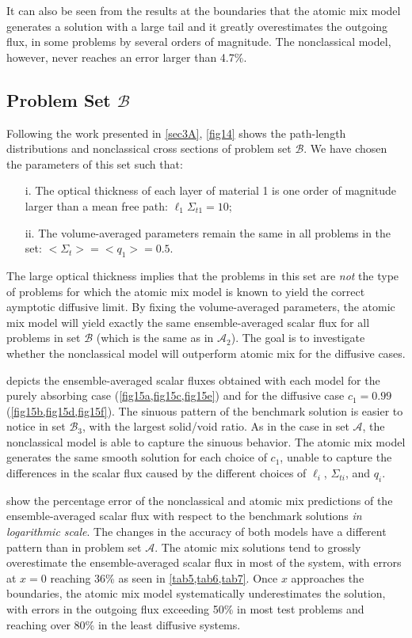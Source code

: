 \documentclass[12pt]{article}
\newcommand{\bl}{\big<}
\newcommand{\bg}{\big>}
\newcommand{\seta}{\mathcal{A}}
\newcommand{\setb}{\mathcal{B}}
\begin{document}
{It can also be seen from the results at the boundaries that the atomic mix model generates a solution with a large tail and it greatly overestimates the outgoing flux, in some problems by several orders of magnitude.
The nonclassical model, however, never reaches an error larger than 4.7\%.

\subsection{Problem Set $\setb$}

Following the work presented in \cref{sec3A}, \cref{fig14} shows the path-length distributions and nonclassical cross sections of problem set $\setb$.
We have chosen the parameters of this set such that:
\begin{itemize}
\item[i.] The optical thickness of each layer of material 1 is one order of magnitude larger than a mean free path: $\ell_1\Sigma_{t1} = 10$;
\vspace{-4pt}
\item[ii.] The volume-averaged parameters remain the same in all problems in the set: $\bl \Sigma_t \bg = \bl q_1 \bg = 0.5$.
\end{itemize}
The large optical thickness implies that the problems in this set are {\em not} the type of problems for which the atomic mix model is known to yield the correct aymptotic diffusive limit.
By fixing the volume-averaged parameters, the atomic mix model will yield exactly the same ensemble-averaged scalar flux for all problems in set $\setb$ (which is the same as in $\seta_2$).
The goal is to investigate whether the nonclassical model will outperform atomic mix for the diffusive cases.

 depicts the ensemble-averaged scalar fluxes obtained with each model for the purely absorbing case (\cref{fig15a,fig15c,fig15e}) and for the diffusive case $c_1=0.99$ (\cref{fig15b,fig15d,fig15f}).
The sinuous pattern of the benchmark solution is easier to notice in set $\setb_3$, with the largest solid/void ratio.
As in the case in set $\seta$, the nonclassical model is able to capture the sinuous behavior.
The atomic mix model generates the same smooth solution for each choice of $c_1$, unable to capture the differences in the scalar flux caused by the different choices of $\ell_i$, $\Sigma_{ti}$, and $q_i$.

 show the percentage error of the nonclassical and atomic mix predictions of the ensemble-averaged scalar flux with respect to the benchmark solutions {\em in logarithmic scale}.
The changes in the accuracy of both models have a different pattern than in problem set $\seta$.
The atomic mix solutions tend to grossly overestimate the ensemble-averaged scalar flux in most of the system, with errors at $x=0$ reaching 36\% as seen in \cref{tab5,tab6,tab7}.
Once $x$ approaches the boundaries, the atomic mix model systematically underestimates the solution, with errors in the outgoing flux exceeding 50\% in most test problems and reaching over 80\% in the least diffusive systems.

}
\end{document}
